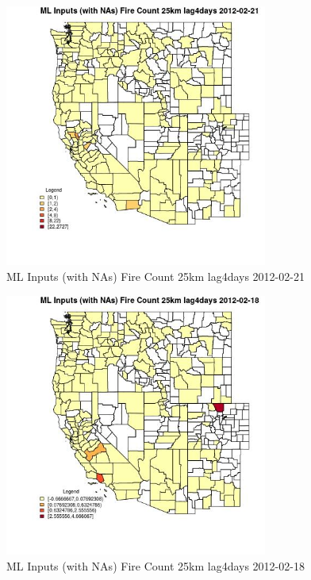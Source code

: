 \begin{figure} 
\centering  
\includegraphics[width=0.77\textwidth]{Code_Outputs/Report_ML_input_PM25_Step4_part_f_de_duplicated_aveswNAs_CountyFire_Count_25km_lag4daysMean2012-02-21.jpg} 
\caption{\label{fig:Report_ML_input_PM25_Step4_part_f_de_duplicated_aveswNAsCountyFire_Count_25km_lag4daysMean2012-02-21}ML Inputs (with NAs) Fire Count 25km lag4days 2012-02-21} 
\end{figure} 
 

\begin{figure} 
\centering  
\includegraphics[width=0.77\textwidth]{Code_Outputs/Report_ML_input_PM25_Step4_part_f_de_duplicated_aveswNAs_CountyFire_Count_25km_lag4daysMean2012-02-18.jpg} 
\caption{\label{fig:Report_ML_input_PM25_Step4_part_f_de_duplicated_aveswNAsCountyFire_Count_25km_lag4daysMean2012-02-18}ML Inputs (with NAs) Fire Count 25km lag4days 2012-02-18} 
\end{figure} 
 

